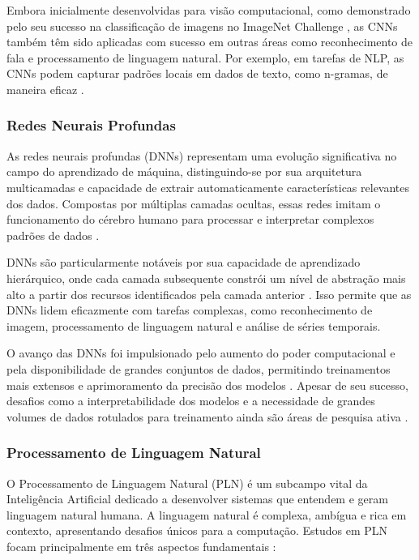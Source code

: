 \documentclass[conference]{IEEEtran}
\begin{document}
Embora inicialmente desenvolvidas para visão computacional, como demonstrado pelo seu sucesso na 
classificação de imagens no ImageNet Challenge \cite{Russakovsky2015}, as CNNs também têm sido aplicadas 
com sucesso em outras áreas como reconhecimento de fala e processamento de linguagem natural. 
Por exemplo, em tarefas de NLP, as CNNs podem capturar padrões locais em dados de texto, 
como n-gramas, de maneira eficaz \cite{Kim2014}.



\subsubsection{Redes Neurais Profundas} As redes neurais profundas (DNNs) representam uma evolução 
significativa no campo do aprendizado de máquina, distinguindo-se por sua arquitetura multicamadas 
e capacidade de extrair automaticamente características relevantes dos dados. 
Compostas por múltiplas camadas ocultas, essas redes imitam o funcionamento do cérebro humano para 
processar e interpretar complexos padrões de dados \cite{LeCun2015}.

DNNs são particularmente notáveis por sua capacidade de aprendizado hierárquico, 
onde cada camada subsequente constrói um nível de abstração mais alto a partir dos recursos 
identificados pela camada anterior \cite{Schmidhuber2015}. 
Isso permite que as DNNs lidem eficazmente com tarefas complexas, como reconhecimento de imagem, 
processamento de linguagem natural e análise de séries temporais.

O avanço das DNNs foi impulsionado pelo aumento do poder computacional e pela disponibilidade de grandes conjuntos de dados, 
permitindo treinamentos mais extensos e aprimoramento da precisão dos modelos \cite{Goodfellow2016}. 
Apesar de seu sucesso, desafios como a interpretabilidade dos modelos e 
a necessidade de grandes volumes de dados rotulados para treinamento 
ainda são áreas de pesquisa ativa \cite{Zhang2018}.



\subsubsection{Processamento de Linguagem Natural}
O Processamento de Linguagem Natural (PLN) é um subcampo vital da Inteligência Artificial dedicado a 
desenvolver sistemas que entendem e geram linguagem natural humana.
A linguagem natural é complexa, ambígua e rica em contexto, apresentando desafios únicos para a computação. 
Estudos em PLN focam principalmente em três aspectos fundamentais \cite{Manning2014}:
\end{document}
